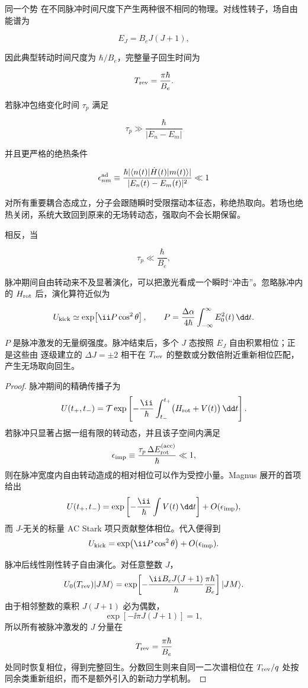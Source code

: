 同一个势  在不同脉冲时间尺度下产生两种很不相同的物理。对线性转子，场自由能谱为

\[
E_J=B_eJ(J+1),
\]

因此典型转动时间尺度为 \(\hbar/B_e\)，完整量子回生时间为

\begin{equation}
T_{\rm rev}=\frac{\pi\hbar}{B_e}.
\label{eq:rotational-revival-time}
\end{equation}

若脉冲包络变化时间 \(\tau_p\) 满足

\[
\tau_p\gg\frac{\hbar}{|E_n-E_m|}
\]

并且更严格的绝热条件

\begin{equation}
\epsilon_{nm}^{\rm ad}
\equiv
\frac{\hbar|\langle n(t)|\dot H(t)|m(t)\rangle|}
{|E_n(t)-E_m(t)|^2}
\ll1
\label{eq:rotational-adiabatic-parameter}
\end{equation}

对所有重要耦合态成立，分子会跟随瞬时受限摆动本征态，称绝热取向。若场也绝热关闭，系统大致回到原来的无场转动态，强取向不会长期保留。

相反，当

\[
\tau_p\ll\frac{\hbar}{B_e},
\]

脉冲期间自由转动来不及显著演化，可以把激光看成一个瞬时“冲击”。忽略脉冲内的 \(H_{\rm rot}\) 后，演化算符近似为

\begin{equation}
U_{\rm kick}
\simeq
\exp\!\left[
\ii P\cos^2\theta
\right],
\qquad
P=\frac{\Delta\alpha}{4\hbar}
\int_{-\infty}^{\infty}E_0^2(t)\,\dd t.
\label{eq:alignment-kick-strength}
\end{equation}

\(P\) 是脉冲激发的无量纲强度。脉冲结束后，多个 \(J\) 态按照 \(E_J\) 自由积累相位；正是这些由  逐级建立的 \(\Delta J=\pm2\) 相干在 \(T_{\rm rev}\) 的整数或分数倍附近重新相位匹配，产生无场取向回生。

\begin{proof}
脉冲期间的精确传播子为
\[
U(t_+,t_-)
=\mathcal T\exp\left[-\frac{\ii}{\hbar}
\int_{t_-}^{t_+}\bigl(H_{\rm rot}+V(t)\bigr)\,\dd t\right].
\]
若脉冲只显著占据一组有限的转动态，并且该子空间内满足
\[
\epsilon_{\rm imp}
\equiv
\frac{\tau_p\,\Delta E_{\rm rot}^{(\rm acc)}}{\hbar}\ll1,
\]
则在脉冲宽度内自由转动造成的相对相位可以作为受控小量。Magnus 展开的首项给出
\[
U(t_+,t_-)
=\exp\left[-\frac{\ii}{\hbar}\int V(t)\,\dd t\right]
+O(\epsilon_{\rm imp}),
\]
而 \(J\)-无关的标量 AC Stark 项只贡献整体相位。代入便得到
\[
U_{\rm kick}
=\exp\!\left(\ii P\cos^2\theta\right)
+O(\epsilon_{\rm imp}).
\]

脉冲后线性刚性转子自由演化。对任意整数 \(J\)，
\[
U_0(T_{\rm rev})|JM\rangle
=\exp\!\left[-\frac{\ii B_eJ(J+1)}{\hbar}
\frac{\pi\hbar}{B_e}\right]|JM\rangle.
\]
由于相邻整数的乘积 \(J(J+1)\) 必为偶数，
\[
\exp[-\ii\pi J(J+1)]=1,
\]
所以所有被脉冲激发的 \(J\) 分量在
\[
T_{\rm rev}=\frac{\pi\hbar}{B_e}
\]
处同时恢复相位，得到完整回生。分数回生则来自同一二次谱相位在 \(T_{\rm rev}/q\) 处按同余类重新组织，而不是额外引入的新动力学机制。
\end{proof}

